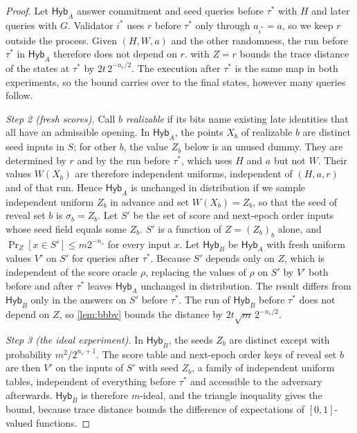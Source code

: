 \documentclass[10pt,journal,compsoc]{IEEEtran}
\theoremstyle{tplain}
\theoremstyle{tdef}
\theoremstyle{remark}
\newcommand{\RO}{\rho}
\begin{document}
\begin{proof}
Let $\mathsf{Hyb}_A$ answer commitment and seed queries before $\tau^\ast$ with $H$ and later queries with $G$. Validator $i^\ast$ uses $r$ before $\tau^\ast$ only through $a_{i^\ast}=a$, so we keep $r$ outside the process. Given $(H,W,a)$ and the other randomness, the run before $\tau^\ast$ in $\mathsf{Hyb}_A$ therefore does not depend on $r$.  with $Z=r$ bounds the trace distance of the states at $\tau^\ast$ by $2t\,2^{-n_r/2}$. The execution after $\tau^\ast$ is the same map in both experiments, so the bound carries over to the final states, however many queries follow.

\emph{Step 2 (fresh scores).} Call $b$ \emph{realizable} if its bits name existing late identities that all have an admissible opening. In $\mathsf{Hyb}_A$, the points $X_b$ of realizable $b$ are distinct seed inputs in $S$; for other $b$, the value $Z_b$ below is an unused dummy. They are determined by $r$ and by the run before $\tau^\ast$, which uses $H$ and $a$ but not $W$. Their values $W(X_b)$ are therefore independent uniforms, independent of $(H,a,r)$ and of that run. Hence $\mathsf{Hyb}_A$ is unchanged in distribution if we sample independent uniform $Z_b$ in advance and set $W(X_b)=Z_b$, so that the seed of reveal set $b$ is $\sigma_b=Z_b$. Let $S'$ be the set of score and next-epoch order inputs whose seed field equals some $Z_b$. $S'$ is a function of $Z=(Z_b)_b$ alone, and $\Pr_Z[x\in S']\le m2^{-n_s}$ for every input $x$. Let $\mathsf{Hyb}_B$ be $\mathsf{Hyb}_A$ with fresh uniform values $V'$ on $S'$ for queries after $\tau^\ast$. Because $S'$ depends only on $Z$, which is independent of the score oracle $\RO$, replacing the values of $\RO$ on $S'$ by $V'$ both before and after $\tau^\ast$ leaves $\mathsf{Hyb}_A$ unchanged in distribution. The result differs from $\mathsf{Hyb}_B$ only in the answers on $S'$ before $\tau^\ast$. The run of $\mathsf{Hyb}_B$ before $\tau^\ast$ does not depend on $Z$, so \cref{lem:bbbv} bounds the distance by $2t\sqrt m\,2^{-n_s/2}$.

\emph{Step 3 (the ideal experiment).} In $\mathsf{Hyb}_B$, the seeds $Z_b$ are distinct except with probability $m^2/2^{n_s+1}$. The score table and next-epoch order keys of reveal set $b$ are then $V'$ on the inputs of $S'$ with seed $Z_b$, a family of independent uniform tables, independent of everything before $\tau^\ast$ and accessible to the adversary afterwards. $\mathsf{Hyb}_B$ is therefore $m$-ideal, and the triangle inequality gives the bound, because trace distance bounds the difference of expectations of $[0,1]$-valued functions.
\end{proof}
\end{document}
